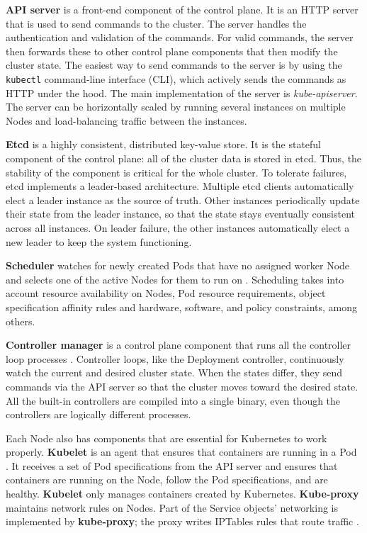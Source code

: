 \documentclass[english, 12pt, a4paper, sci, utf8, a-2b, online]{aaltothesis}
\begin{document}
\textbf{API server} is a front-end component of the control plane.
It is an HTTP server that is used to send commands to the cluster.
The server handles the authentication and validation of the commands.
For valid commands, the server then forwards these to other control plane components that then modify the cluster state.
The easiest way to send commands to the server is by using the \lstinline{kubectl} command-line interface (CLI), which actively sends the commands as HTTP under the hood.
The main implementation of the server is \emph{kube-apiserver}.
The server can be horizontally scaled by running several instances on multiple Nodes and load-balancing traffic between the instances.

\textbf{Etcd} \cite{etcd} is a highly consistent, distributed key-value store.
It is the stateful component of the control plane: all of the cluster data is stored in etcd.
Thus, the stability of the component is critical for the whole cluster.
To tolerate failures, etcd implements a leader-based architecture.
Multiple etcd clients automatically elect a leader instance as the source of truth.
Other instances periodically update their state from the leader instance, so that the state stays eventually consistent across all instances.
On leader failure, the other instances automatically elect a new leader to keep the system functioning.

\textbf{Scheduler} watches for newly created Pods that have no assigned worker Node and selects one of the active Nodes for them to run on \cite{k8s-docs-control-plane}.
Scheduling takes into account resource availability on Nodes, Pod resource requirements, object specification affinity rules and hardware, software, and policy constraints, among others.

\textbf{Controller manager} is a control plane component that runs all the controller loop processes \cite{k8s-docs-control-plane}.
Controller loops, like the Deployment controller, continuously watch the current and desired cluster state.
When the states differ, they send commands via the API server so that the cluster moves toward the desired state.
All the built-in controllers are compiled into a single binary, even though the controllers are logically different processes.

Each Node also has components that are essential for Kubernetes to work properly.
\textbf{Kubelet} is an agent that ensures that containers are running in a Pod \cite{k8s-docs-control-plane}.
It receives a set of Pod specifications from the API server and ensures that containers are running on the Node, follow the Pod specifications, and are healthy.
\textbf{Kubelet} only manages containers created by Kubernetes.
\textbf{Kube-proxy} maintains network rules on Nodes.
Part of the Service objects' networking is implemented by \textbf{kube-proxy}; the proxy writes IPTables rules that route traffic \cite{cilium-proxy-free}.
\end{document}
